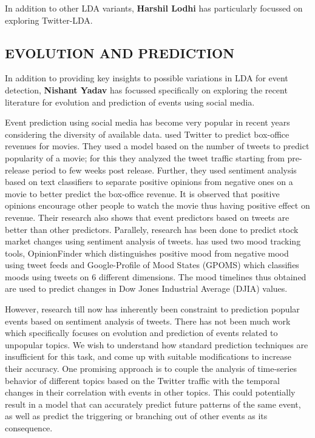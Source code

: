 In addition to other LDA variants, {\bf Harshil Lodhi} has particularly focussed on exploring Twitter-LDA.

\subsection{\uppercase{Evolution and Prediction}}
In addition to providing key insights to possible variations in LDA for event detection, {\bf Nishant Yadav} has focussed specifically on exploring the recent literature for evolution and prediction of events using social media.

Event prediction using social media has become very popular in recent years considering the diversity of available data. \cite{asur2010predicting} used Twitter to predict box-office revenues for movies. They used a model based on the number of tweets to predict popularity of a movie; for this they analyzed the tweet traffic starting from pre-release period to few weeks post release. Further, they used sentiment analysis based on text classifiers to separate positive opinions from negative ones on a movie to better predict the box-office revenue. It is observed that positive opinions encourage other people to watch the movie thus having positive effect on revenue. Their research also shows that event predictors based on tweets are better than other predictors. Parallely, research has been done to predict stock market changes using sentiment analysis of tweets. \cite{bollen2011twitter} has used two mood tracking tools, OpinionFinder which distinguishes positive mood from negative mood using tweet feeds and Google-Profile of Mood States (GPOMS) which classifies moods using tweets on 6 different dimensions. The mood timelines thus obtained are used to predict changes in Dow Jones Industrial Average (DJIA) values.

However, research till now has inherently been constraint to prediction popular events based on sentiment analysis of tweets. There has not been much work which specifically focuses on evolution and prediction of events related to unpopular topics. We wish to understand how standard prediction techniques are insufficient for this task, and come up with suitable modifications to increase their accuracy. One promising approach is to couple the analysis of time-series behavior of different topics based on the Twitter traffic with the temporal changes in their correlation with events in other topics. This could potentially result in a model that can accurately predict future patterns of the same event, as well as predict the triggering or branching out of other events as its consequence.